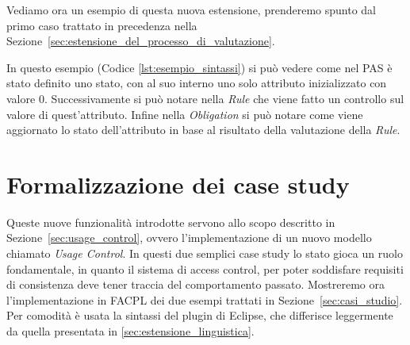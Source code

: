 Vediamo ora un esempio di questa nuova estensione, prenderemo spunto dal primo caso trattato in precedenza nella Sezione~\ref{sec:estensione_del_processo_di_valutazione}.

In questo esempio (Codice \ref{lst:esempio_sintassi}) si può vedere come nel PAS è stato definito uno stato, con al suo interno uno solo attributo inizializzato con valore $0$.
Successivamente si può notare nella \textit{Rule} che viene fatto un controllo sul valore di quest'attributo.
Infine nella \textit{Obligation} si può notare come viene aggiornato lo stato dell'attributo in base al risultato della valutazione della \textit{Rule}.

\section{Formalizzazione dei case study} %
\label{sec:esempi}

Queste nuove funzionalità introdotte servono allo scopo descritto in Sezione~\ref{sec:usage_control}, ovvero l'implementazione di un nuovo modello chiamato \textit{Usage Control}.
In questi due semplici case study lo stato gioca un ruolo fondamentale, in quanto il sistema di access control, per poter soddisfare requisiti di consistenza deve tener traccia del comportamento passato.
Mostreremo ora l'implementazione in \ac{FACPL} dei due esempi trattati in Sezione~\ref{sec:casi_studio}. Per comodità è usata la sintassi del plugin di Eclipse, che differisce leggermente da quella presentata in \ref{sec:estensione_linguistica}. 

